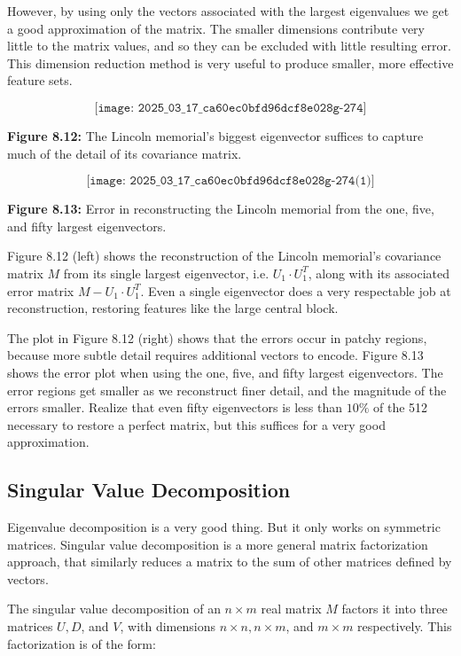 \documentclass[10pt]{article}
\begin{document}
However, by using only the vectors associated with the largest eigenvalues we get a good approximation of the matrix. The smaller dimensions contribute very little to the matrix values, and so they can be excluded with little resulting error. This dimension reduction method is very useful to produce smaller, more effective feature sets.

\[
\texttt{[image: 2025\_03\_17\_ca60ec0bfd96dcf8e028g-274]}
\]

\textbf{Figure 8.12:} The Lincoln memorial's biggest eigenvector suffices to capture much of the detail of its covariance matrix.

\[
\texttt{[image: 2025\_03\_17\_ca60ec0bfd96dcf8e028g-274(1)]}
\]

\textbf{Figure 8.13:} Error in reconstructing the Lincoln memorial from the one, five, and fifty largest eigenvectors.

Figure 8.12 (left) shows the reconstruction of the Lincoln memorial's covariance matrix \(M\) from its single largest eigenvector, i.e. \(U_{1} \cdot U_{1}^{T}\), along with its associated error matrix \(M-U_{1} \cdot U_{1}^{T}\). Even a single eigenvector does a very respectable job at reconstruction, restoring features like the large central block.

The plot in Figure 8.12 (right) shows that the errors occur in patchy regions, because more subtle detail requires additional vectors to encode. Figure 8.13 shows the error plot when using the one, five, and fifty largest eigenvectors. The error regions get smaller as we reconstruct finer detail, and the magnitude of the errors smaller. Realize that even fifty eigenvectors is less than \(10\%\) of the 512 necessary to restore a perfect matrix, but this suffices for a very good approximation.

\subsection*{Singular Value Decomposition}
Eigenvalue decomposition is a very good thing. But it only works on symmetric matrices. Singular value decomposition is a more general matrix factorization approach, that similarly reduces a matrix to the sum of other matrices defined by vectors.

The singular value decomposition of an \(n \times m\) real matrix \(M\) factors it into three matrices \(U, D\), and \(V\), with dimensions \(n \times n, n \times m\), and \(m \times m\) respectively. This factorization is of the form:
\end{document}
